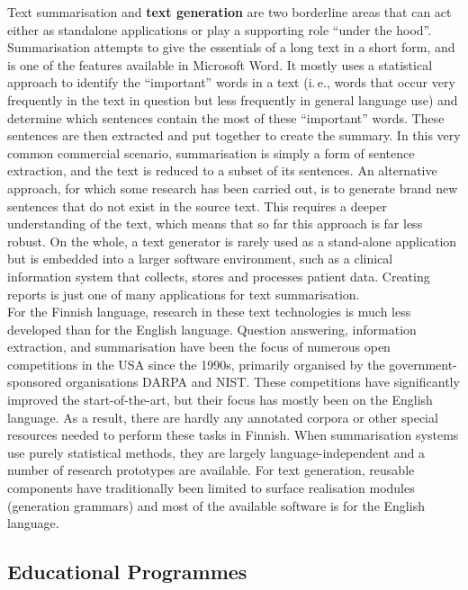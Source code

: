 \begin{multicols}{2}

Text summarisation and \textbf{text generation} are two borderline areas that can act
either as standalone applications or play a supporting role “under the hood”.
Summarisation attempts to give the essentials of a long text in a short form,
and is one of the features available in Microsoft Word. It mostly uses a
statistical approach to identify the “important” words in a text (i.\,e., words
that occur very frequently in the text in question but less frequently in
general language use) and determine which sentences contain the most of these
“important” words. These sentences are then extracted and put together to
create the summary. In this very common commercial scenario, summarisation is
simply a form of sentence extraction, and the text is reduced to a subset of
its sentences. An alternative approach, for which some research has been
carried out, is to generate brand new sentences that do not exist in the source
text. This requires a deeper understanding of the text, which means that so far
this approach is far less robust. On the whole, a text generator is rarely used
as a stand-alone application but is embedded into a larger software
environment, such as a clinical information system that collects, stores and
processes patient data. Creating reports is just one of many applications for
text summarisation.\\
For the Finnish language, research in these text technologies is much
less developed than for the English language. Question answering,
information extraction, and summarisation have been the focus of
numerous open competitions in the USA since the 1990s, primarily
organised by the government-sponsored organisations DARPA and
NIST. These competitions have significantly improved the
start-of-the-art, but their focus has mostly been on the English
language.  As a result, there are hardly any annotated corpora or
other special resources needed to perform these tasks in Finnish. When
summarisation systems use purely statistical methods, they are largely
language-independent and a number of research prototypes are
available. For text generation, reusable components have traditionally
been limited to surface realisation modules (generation grammars) and
most of the available software is for the English language.  


\subsection{Educational Programmes}


\end{multicols}
